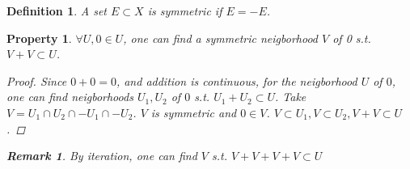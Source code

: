 \documentclass{article}
\newtheorem*{property}{Property}
\newtheorem*{definition}{Definition}
\newtheorem*{remark}{Remark}
\begin{document}
\begin{definition}
  A set $E \subset X$ is symmetric if $E = -E$.
\end{definition}
\begin{property}
  $\forall U, 0 \in U$, one can find a symmetric neigborhood $V$ of 0 s.t.
  $V + V \subset U$.
  \begin{proof}
    Since $0 + 0 = 0$, and addition is continuous, 
    for the neigborhood $U$ of $0$, one can find neigborhoods $U_1, U_2$
    of $0$ s.t. $U_1 + U_2 \subset U$. 
    Take $V = U_1 \cap U_2 \cap -U_1 \cap -U_2$. 
    $V$ is symmetric and $0 \in V$. 
    $V \subset U_1, V \subset U_2, V + V \subset U$.
  \end{proof}
  \begin{remark}
    By iteration, one can find $V$ s.t. 
    $V + V + V + V \subset U$
  \end{remark}
\end{property}
\end{document}
